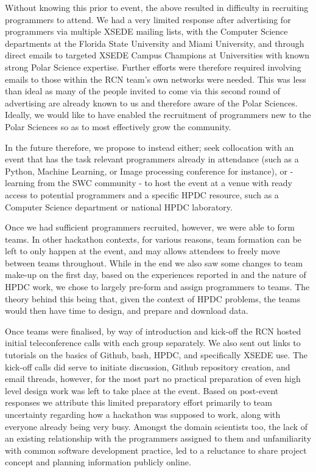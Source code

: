 \documentclass[conference]{IEEEtran}
\begin{document}
Without knowing this prior to event, the above resulted in difficulty in recruiting programmers to attend.  We had a very limited response after advertising for programmers via multiple XSEDE mailing lists, with the Computer Science departments at the Florida State University and Miami University, and through direct emails to targeted XSEDE Campus Champions at Universities with known strong Polar Science expertise.  Further efforts were therefore required involving emails to those within the RCN team’s own networks were needed.  This was less than ideal as many of the people invited to come via this second round of advertising are already known to us and therefore aware of the Polar Sciences.  Ideally, we would like to have enabled the recruitment of programmers new to the Polar Sciences so as to most effectively grow the community.  

In the future therefore, we propose to instead either; seek collocation with an event that has the task relevant programmers already in attendance (such as a Python, Machine Learning, or Image processing conference for instance), or - learning from the SWC community - to host the event at a venue with ready access to potential programmers and a specific HPDC resource, such as a Computer Science department or national HPDC laboratory.

Once we had sufficient programmers recruited, however, we were able to form teams.  In other hackathon contexts, for various reasons, team formation can be left to only happen at the event, and may allows attendees to freely move between teams throughout.  While in the end we also saw some changes to team make-up on the first day, based on the experiences reported in \cite{noauthor_undated-mn} and the nature of HPDC work, we chose to largely pre-form and assign programmers to teams.  The theory behind this being that, given the context of HPDC problems, the teams would then have time to design, and prepare and download data.

Once teams were finalised, by way of introduction and kick-off the RCN hosted initial teleconference calls with each group separately.  We also sent out links to tutorials on the basics of Github, bash, HPDC, and specifically XSEDE use.  The kick-off calls did serve to initiate discussion, Github repository creation, and email threads, however, for the most part no practical preparation of even high level design work was left to take place at the event.  Based on post-event responses we attribute this limited preparatory effort primarily to team uncertainty regarding how a hackathon was supposed to work, along with everyone already being very busy.  Amongst the domain scientists too, the lack of an existing relationship with the programmers assigned to them and unfamiliarity with common software development practice, led to a reluctance to share project concept and planning information publicly online.
\end{document}

